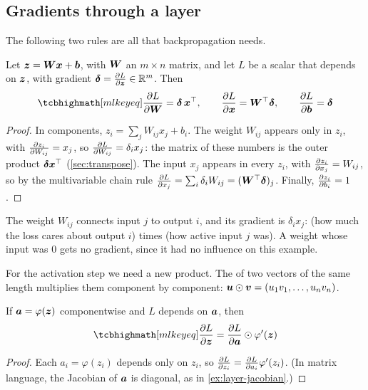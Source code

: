 \subsection{Gradients through a layer}

The following two rules are all that backpropagation needs.

\begin{theorem}\label{thm:linear-layer-gradients}
Let $\bm{z} = \bm{W}\bm{x} + \bm{b}$, with $\bm{W}$ an $m\times n$ matrix, and let $L$ be a scalar
that depends on $\bm{z}$, with gradient $\bm{\delta} = \frac{\partial L}{\partial \bm{z}} \in \mathbb{R}^m$. Then
\[
  \keyeq{\pderiv{L}{\mW} = \vdelta\,\vx^\top, \qquad
  \pderiv{L}{\vx} = \mW^\top\vdelta, \qquad
  \pderiv{L}{\vb} = \vdelta}
\]
\end{theorem}

\begin{proof}
In components, $z_i = \sum_jW_{ij}x_j + b_i$. The weight $W_{ij}$ appears only in
$z_i$, with $\frac{\partial z_i}{\partial W_{ij}} = x_j$, so $\frac{\partial L}{\partial W_{ij}} = \delta_ix_j$:
the matrix of these numbers is the outer product $\bm{\delta}\bm{x}^\top$
(\cref{sec:transpose}). The input $x_j$ appears in every $z_i$, with
$\frac{\partial z_i}{\partial x_j} = W_{ij}$, so by the multivariable chain rule
$\frac{\partial L}{\partial x_j} = \sum_i\delta_iW_{ij} = (\bm{W}^\top\bm{\delta})_j$. Finally,
$\frac{\partial z_i}{\partial b_i} = 1$.
\end{proof}

\begin{intuition}
The weight $W_{ij}$ connects input $j$ to output $i$, and its gradient is
$\delta_ix_j$: (how much the loss cares about output $i$) times (how active input
$j$ was). A weight whose input was $0$ gets no gradient, since it had no
influence on this example.
\end{intuition}

For the activation step we need a new product. The  of two
vectors of the same length multiplies them component by component:
$\bm{u} \odot \bm{v} = (u_1v_1, \dots, u_nv_n)$.

\begin{theorem}\label{thm:activation-gradients}
If $\bm{a} = \varphi(\bm{z})$ componentwise and $L$ depends on $\bm{a}$, then
\[
  \keyeq{\pderiv{L}{\vz} = \pderiv{L}{\va} \odot \varphi'(\vz)}
\]
\end{theorem}

\begin{proof}
Each $a_i = \varphi(z_i)$ depends only on $z_i$, so
$\frac{\partial L}{\partial z_i} = \frac{\partial L}{\partial a_i}\varphi'(z_i)$. (In matrix language, the Jacobian
of $\bm{a}$ is diagonal, as in \cref{ex:layer-jacobian}.)
\end{proof}

